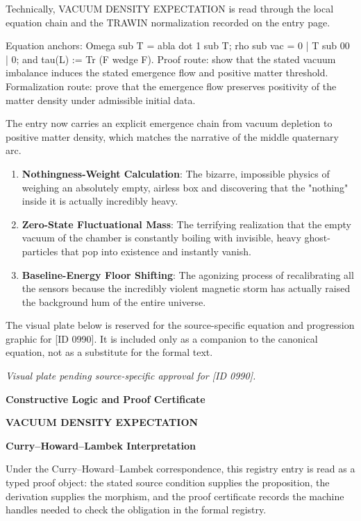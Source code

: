 Technically, VACUUM DENSITY EXPECTATION is read through the local equation chain and the TRAWIN normalization recorded on the entry page.

Equation anchors: Omega sub T = abla dot 1 sub T; rho sub vac = 0 | T sub 00 | 0; and tau(L) := Tr (F wedge F). Proof route: show that the stated vacuum imbalance induces the stated emergence flow and positive matter threshold. Formalization route: prove that the emergence flow preserves positivity of the matter density under admissible initial data.

The entry now carries an explicit emergence chain from vacuum depletion to positive matter density, which matches the narrative of the middle quaternary arc.
\endgroup

\begin{enumerate}[leftmargin=1.6em,itemsep=6pt,topsep=4pt]
\item \textbf{Nothingness-Weight Calculation}: The bizarre, impossible physics of weighing an absolutely empty, airless box and discovering that the "nothing" inside it is actually incredibly heavy.
\item \textbf{Zero-State Fluctuational Mass}: The terrifying realization that the empty vacuum of the chamber is constantly boiling with invisible, heavy ghost-particles that pop into existence and instantly vanish.
\item \textbf{Baseline-Energy Floor Shifting}: The agonizing process of recalibrating all the sensors because the incredibly violent magnetic storm has actually raised the background hum of the entire universe.
\end{enumerate}

\begingroup\footnotesize\sloppy
The visual plate below is reserved for the source-specific equation and progression graphic for [ID 0990]. It is included only as a companion to the canonical equation, not as a substitute for the formal text.
\par\endgroup
\begingroup\footnotesize\itshape
Visual plate pending source-specific approval for [ID 0990].
\par\endgroup

\clearpage
\begingroup\tzpsupportsetup
\noindent\textbf{\fontsize{10.8pt}{12.8pt}\selectfont [ID 0990] Constructive Logic and Proof Certificate}\par
\noindent\textbf{\fontsize{10pt}{12pt}\selectfont VACUUM DENSITY EXPECTATION}\par
\vspace{0.45em}
\begingroup
\footnotesize
\setlength{\parskip}{0.22em}
\setlength{\parindent}{0pt}
\noindent\textbf{Curry--Howard--Lambek Interpretation}\par
Under the Curry--Howard--Lambek correspondence, this registry entry is read as a typed proof
object: the stated source condition supplies the proposition, the derivation supplies the
morphism, and the proof certificate records the machine handles needed to check the obligation
in the formal registry.

